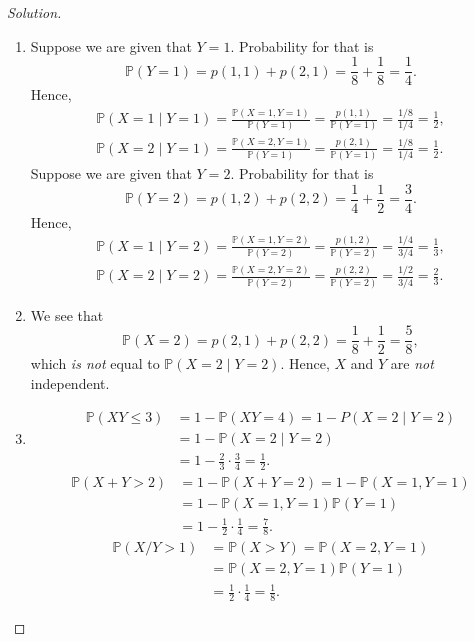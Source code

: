 \documentclass{article}[12pt]
\newenvironment{solution}
  {\renewcommand\qedsymbol{$\blacksquare$}\begin{proof}[Solution]}
  {\end{proof}}
\renewcommand{\P}{\mathbb{P}}
\begin{document}
\begin{solution}
\text{}
\begin{enumerate}[label=(\alph*)]
    \item Suppose we are given that $Y = 1$.
    Probability for that is
    \begin{equation*}
        \P(Y = 1) = p(1,1) + p(2,1) = \frac{1}{8} + \frac{1}{8} = \frac{1}{4}.
    \end{equation*}
    Hence,
    \begin{gather*}
        \P(X = 1\mid Y = 1) = \frac{\P(X = 1, Y = 1)}{\P(Y = 1)} = \frac{p(1,1)}{\P(Y = 1)} = \frac{1/8}{1/4} = \frac{1}{2},
        \\
        \P(X = 2\mid Y = 1) = \frac{\P(X = 2, Y = 1)}{\P(Y = 1)} = \frac{p(2,1)}{\P(Y = 1)} = \frac{1/8}{1/4} = \frac{1}{2}.
    \end{gather*}
    Suppose we are given that $Y = 2$.
    Probability for that is
    \begin{equation*}
        \P(Y = 2) = p(1,2) + p(2,2) = \frac{1}{4} + \frac{1}{2} = \frac{3}{4}.
    \end{equation*}
    Hence,
    \begin{gather*}
        \P(X = 1\mid Y = 2) = \frac{\P(X = 1, Y = 2)}{\P(Y = 2)} = \frac{p(1,2)}{\P(Y = 2)} = \frac{1/4}{3/4} = \frac{1}{3},
        \\
        \P(X = 2\mid Y = 2) = \frac{\P(X = 2, Y = 2)}{\P(Y = 2)} = \frac{p(2,2)}{\P(Y = 2)} = \frac{1/2}{3/4} = \frac{2}{3}.
    \end{gather*}
    \item We see that
    \begin{equation*}
        \P(X = 2) = p(2,1) + p(2,2) = \frac{1}{8} + \frac{1}{2} = \frac{5}{8},
    \end{equation*}
    which \textit{is not} equal to $\P(X = 2\mid Y = 2)$.
    Hence, $X$ and $Y$ are \textit{not} independent.
    \item \text{}
    \begin{align*}
        \P(XY \leqslant 3) &= 1 - \P(XY = 4) = 1 - P(X = 2\mid Y = 2)
        \\
        &= 1 - \P(X = 2\mid Y = 2)
        \\
        &= 1 - \frac{2}{3}\cdot\frac{3}{4} = \frac{1}{2}.
    \end{align*}
    \begin{align*}
        \P(X + Y > 2) &= 1 - \P(X + Y = 2) = 1 - \P(X = 1, Y = 1)
        \\
        &= 1 - \P(X = 1, Y = 1)\P(Y = 1)
        \\
        &= 1 - \frac{1}{2}\cdot\frac{1}{4} = \frac{7}{8}.
    \end{align*}
    \begin{align*}
        \P(X/Y > 1) &= \P(X > Y) = \P(X = 2, Y = 1)
        \\
        &= \P(X = 2, Y = 1)\P(Y = 1)
        \\
        &= \frac{1}{2}\cdot\frac{1}{4} = \frac{1}{8}.
    \end{align*}
\end{enumerate}
\end{solution}
\end{document}
